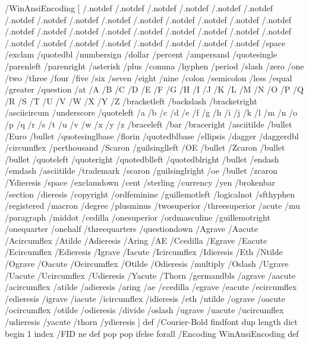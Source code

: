 /WinAnsiEncoding [
/.notdef /.notdef /.notdef /.notdef /.notdef
/.notdef /.notdef /.notdef /.notdef /.notdef
/.notdef /.notdef /.notdef /.notdef /.notdef
/.notdef /.notdef /.notdef /.notdef /.notdef
/.notdef /.notdef /.notdef /.notdef /.notdef
/.notdef /.notdef /.notdef /.notdef /.notdef
/.notdef /.notdef /space /exclam /quotedbl
/numbersign /dollar /percent /ampersand /quotesingle
/parenleft /parenright /asterisk /plus /comma
/hyphen /period /slash /zero /one
/two /three /four /five /six
/seven /eight /nine /colon /semicolon
/less /equal /greater /question /at
/A /B /C /D /E
/F /G /H /I /J
/K /L /M /N /O
/P /Q /R /S /T
/U /V /W /X /Y
/Z /bracketleft /backslash /bracketright /asciicircum
/underscore /quoteleft /a /b /c
/d /e /f /g /h
/i /j /k /l /m
/n /o /p /q /r
/s /t /u /v /w
/x /y /z /braceleft /bar
/braceright /asciitilde /bullet /Euro /bullet
/quotesinglbase /florin /quotedblbase /ellipsis /dagger
/daggerdbl /circumflex /perthousand /Scaron /guilsinglleft
/OE /bullet /Zcaron /bullet /bullet
/quoteleft /quoteright /quotedblleft /quotedblright /bullet
/endash /emdash /asciitilde /trademark /scaron
/guilsinglright /oe /bullet /zcaron /Ydieresis
/space /exclamdown /cent /sterling /currency
/yen /brokenbar /section /dieresis /copyright
/ordfeminine /guillemotleft /logicalnot /sfthyphen /registered
/macron /degree /plusminus /twosuperior /threesuperior
/acute /mu /paragraph /middot /cedilla
/onesuperior /ordmasculine /guillemotright /onequarter /onehalf
/threequarters /questiondown /Agrave /Aacute /Acircumflex
/Atilde /Adieresis /Aring /AE /Ccedilla
/Egrave /Eacute /Ecircumflex /Edieresis /Igrave
/Iacute /Icircumflex /Idieresis /Eth /Ntilde
/Ograve /Oacute /Ocircumflex /Otilde /Odieresis
/multiply /Oslash /Ugrave /Uacute /Ucircumflex
/Udieresis /Yacute /Thorn /germandbls /agrave
/aacute /acircumflex /atilde /adieresis /aring
/ae /ccedilla /egrave /eacute /ecircumflex
/edieresis /igrave /iacute /icircumflex /idieresis
/eth /ntilde /ograve /oacute /ocircumflex
/otilde /odieresis /divide /oslash /ugrave
/uacute /ucircumflex /udieresis /yacute /thorn
/ydieresis
] def
/Courier-Bold findfont
dup length dict begin
  {1 index /FID ne {def} {pop pop} ifelse} forall
  /Encoding WinAnsiEncoding def
